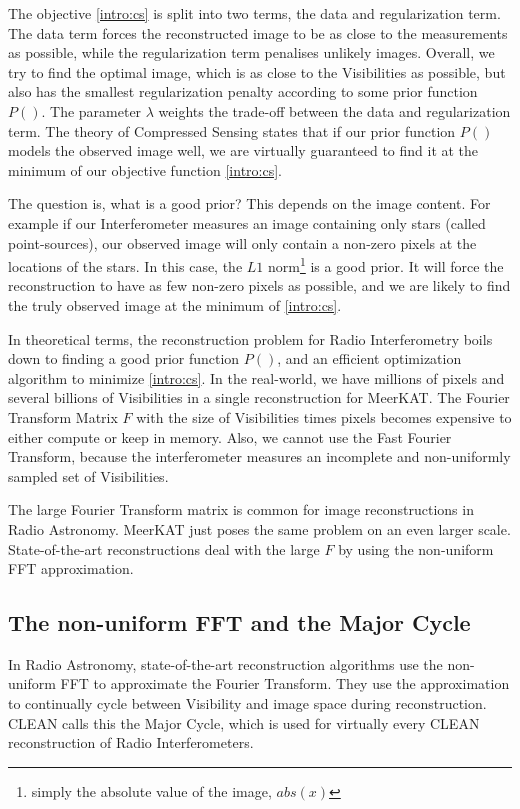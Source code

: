 The objective \eqref{intro:cs} is split into two terms, the data and regularization term. The data term forces the reconstructed image to be as close to the measurements as possible, while the regularization term penalises unlikely images. Overall, we try to find the optimal image, which is as close to the Visibilities as possible, but also has the smallest regularization penalty according to some prior function $P()$. The parameter $\lambda$ weights the trade-off between the data and regularization term. The theory of Compressed Sensing states that if our prior function $P()$ models the observed image well, we are virtually guaranteed to find it at the minimum of our objective function \eqref{intro:cs}.

The question is, what is a good prior? This depends on the image content. For example if our Interferometer measures an image containing only stars (called point-sources), our observed image will only contain a non-zero pixels at the locations of the stars. In this case, the $L1$ norm\footnote{simply the absolute value of the image, $abs(x)$} is a good prior. It will force the reconstruction to have as few non-zero pixels as possible, and we are likely to find the truly observed image at the minimum of \eqref{intro:cs}.

In theoretical terms, the reconstruction problem for Radio Interferometry boils down to finding a good prior function $P()$, and an efficient optimization algorithm to minimize \eqref{intro:cs}. In the real-world, we have millions of pixels and several billions of Visibilities in a single reconstruction for MeerKAT. The Fourier Transform Matrix $F$ with the size of Visibilities times pixels becomes expensive to either compute or keep in memory. Also, we cannot use the Fast Fourier Transform, because the interferometer measures an incomplete and non-uniformly sampled set of Visibilities.

The large Fourier Transform matrix is common for image reconstructions in Radio Astronomy. MeerKAT just poses the same problem on an even larger scale.
State-of-the-art reconstructions deal with the large $F$ by using the non-uniform FFT approximation.

\subsection{The non-uniform FFT and the Major Cycle}\label{intro:nufft}
In Radio Astronomy, state-of-the-art reconstruction algorithms use the non-uniform FFT to approximate the Fourier Transform. They use the approximation to continually cycle between Visibility and image space during reconstruction. CLEAN calls this the Major Cycle, which is used for virtually every CLEAN reconstruction of Radio Interferometers. 

